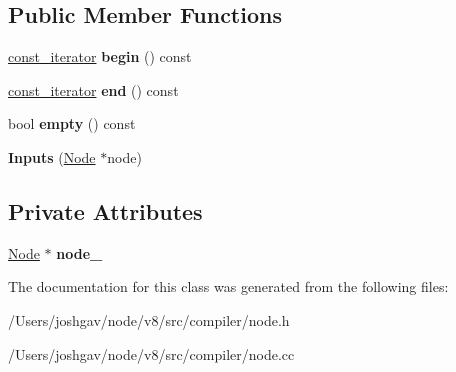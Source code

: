 \subsection*{Public Member Functions}
\begin{DoxyCompactItemize}
\item 
\hyperlink{classv8_1_1internal_1_1compiler_1_1_node_1_1_inputs_1_1const__iterator}{const\+\_\+iterator} {\bfseries begin} () const \hypertarget{classv8_1_1internal_1_1compiler_1_1_node_1_1_inputs_a785c7a275976617f8c2e5f00cee6f3a6}{}\label{classv8_1_1internal_1_1compiler_1_1_node_1_1_inputs_a785c7a275976617f8c2e5f00cee6f3a6}

\item 
\hyperlink{classv8_1_1internal_1_1compiler_1_1_node_1_1_inputs_1_1const__iterator}{const\+\_\+iterator} {\bfseries end} () const \hypertarget{classv8_1_1internal_1_1compiler_1_1_node_1_1_inputs_a2136f037c357d64b23161db447de093d}{}\label{classv8_1_1internal_1_1compiler_1_1_node_1_1_inputs_a2136f037c357d64b23161db447de093d}

\item 
bool {\bfseries empty} () const \hypertarget{classv8_1_1internal_1_1compiler_1_1_node_1_1_inputs_a31a6fe42e40446f3b1c95357272036c0}{}\label{classv8_1_1internal_1_1compiler_1_1_node_1_1_inputs_a31a6fe42e40446f3b1c95357272036c0}

\item 
{\bfseries Inputs} (\hyperlink{classv8_1_1internal_1_1compiler_1_1_node}{Node} $\ast$node)\hypertarget{classv8_1_1internal_1_1compiler_1_1_node_1_1_inputs_aa697e371e9da2a29625a1617e3bf8e28}{}\label{classv8_1_1internal_1_1compiler_1_1_node_1_1_inputs_aa697e371e9da2a29625a1617e3bf8e28}

\end{DoxyCompactItemize}
\subsection*{Private Attributes}
\begin{DoxyCompactItemize}
\item 
\hyperlink{classv8_1_1internal_1_1compiler_1_1_node}{Node} $\ast$ {\bfseries node\+\_\+}\hypertarget{classv8_1_1internal_1_1compiler_1_1_node_1_1_inputs_aa25eac7ace082e1ded0a6dd3ab6049b9}{}\label{classv8_1_1internal_1_1compiler_1_1_node_1_1_inputs_aa25eac7ace082e1ded0a6dd3ab6049b9}

\end{DoxyCompactItemize}


The documentation for this class was generated from the following files\+:\begin{DoxyCompactItemize}
\item 
/\+Users/joshgav/node/v8/src/compiler/node.\+h\item 
/\+Users/joshgav/node/v8/src/compiler/node.\+cc\end{DoxyCompactItemize}
